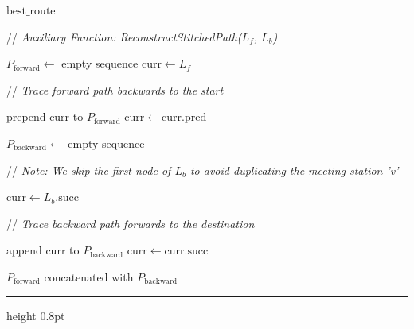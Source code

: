 \documentclass{article}
\newcommand{\CommentLine}[1]{
    \State // \textit{#1}
}
\begin{document}
\begin{algorithmic}[1]
    \State \Return $\text{best\_route}$

    \vspace{1.5em}
    \CommentLine{Auxiliary Function: ReconstructStitchedPath($L_f$, $L_b$)}
    \Statex
    \State $P_{\text{forward}} \leftarrow$ empty sequence
    \State $\text{curr} \leftarrow L_f$
    \CommentLine{Trace forward path backwards to the start}
        \State prepend $\text{curr}$ to $P_{\text{forward}}$
        \State $\text{curr} \leftarrow \text{curr}.\text{pred}$
    \EndWhile

    \vspace{0.5em}
    \State $P_{\text{backward}} \leftarrow$ empty sequence
    \CommentLine{Note: We skip the first node of $L_b$ to avoid duplicating the meeting station 'v'}
    \State $\text{curr} \leftarrow L_b.\text{succ}$
    \CommentLine{Trace backward path forwards to the destination}
        \State append $\text{curr}$ to $P_{\text{backward}}$
        \State $\text{curr} \leftarrow \text{curr}.\text{succ}$
    \EndWhile

    \State \Return $P_{\text{forward}}$ concatenated with $P_{\text{backward}}$

\end{algorithmic}

\hrule height 0.8pt
\end{document}
